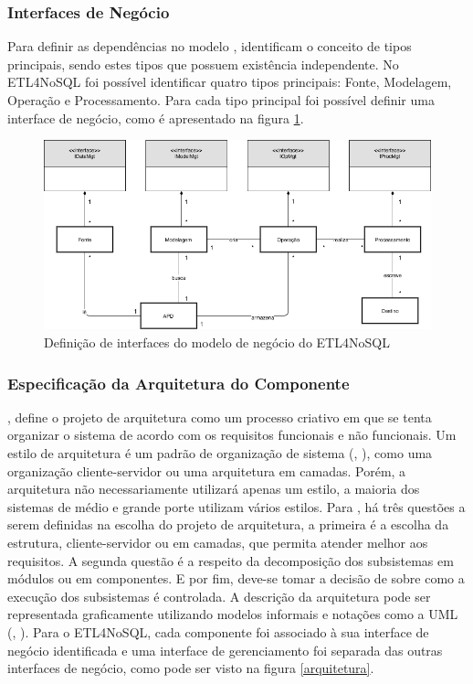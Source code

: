 \subsubsection{Interfaces de Negócio}

Para definir as dependências no modelo \cite{cheesman:2001}, identificam o conceito de tipos principais, sendo estes tipos que possuem existência independente.
No ETL4NoSQL foi possível identificar quatro tipos principais: Fonte, Modelagem, Operação e Processamento. Para cada tipo principal foi possível definir uma interface de negócio, como é apresentado na figura \ref{modelo_negocio}.

\begin{figure}[h]
	\centering
	\includegraphics[scale=0.58]{fig/modelo_negocio.png}
	\caption{Definição de interfaces do modelo de negócio do ETL4NoSQL}
	\label{modelo_negocio}
\end{figure}

\subsubsection{Especificação da Arquitetura do Componente}

\cite{sommerville:2013}, define o projeto de arquitetura como um processo criativo em que se tenta organizar o sistema de acordo com os requisitos funcionais e não funcionais. Um estilo de arquitetura é um padrão de organização de sistema (\cite{shaw:1996}, \cite{sommerville:2013}), como uma organização cliente-servidor ou uma arquitetura em camadas. Porém, a arquitetura não necessariamente utilizará apenas um estilo, a maioria dos sistemas de médio e grande porte utilizam vários estilos. Para \cite{shaw:1996}, há três questões a serem definidas na escolha do projeto de arquitetura, a primeira é a escolha da estrutura, cliente-servidor ou em camadas, que permita atender melhor aos requisitos. A segunda questão é a respeito da decomposição dos subsistemas em módulos ou em componentes. E por fim, deve-se tomar a decisão de sobre como a execução dos subsistemas é controlada. A descrição da arquitetura pode ser representada graficamente utilizando modelos informais e notações como a UML (\cite{clements:2002}, \cite{sommerville:2013}). Para o ETL4NoSQL, cada componente foi associado à sua interface de negócio identificada e uma interface de gerenciamento foi separada das outras interfaces de negócio, como pode ser visto na figura \ref{arquitetura}.

